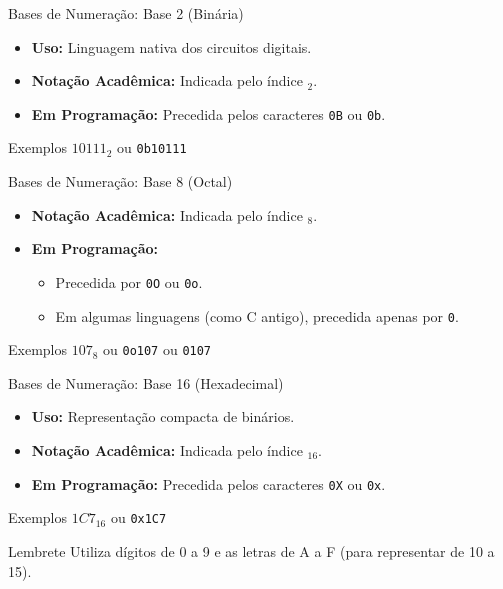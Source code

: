 \begin{frame}{Bases de Numeração: Base 2 (Binária)}
    \begin{itemize}
        \item \textbf{Uso:} Linguagem nativa dos circuitos digitais.
        \item \textbf{Notação Acadêmica:} Indicada pelo índice $_2$.
        \item \textbf{Em Programação:} Precedida pelos caracteres \texttt{0B} ou \texttt{0b}.
    \end{itemize}

    \begin{exampleblock}{Exemplos}
        \centering
        $10111_2$ \quad ou \quad \texttt{0b10111}
    \end{exampleblock}


\end{frame}

\begin{frame}{Bases de Numeração: Base 8 (Octal)}
    \begin{itemize}
        \item \textbf{Notação Acadêmica:} Indicada pelo índice $_8$.
        \item \textbf{Em Programação:}
              \begin{itemize}
                  \item Precedida por \texttt{0O} ou \texttt{0o}.
                  \item Em algumas linguagens (como C antigo), precedida apenas por \texttt{0}.
              \end{itemize}
    \end{itemize}

    \begin{exampleblock}{Exemplos}
        \centering
        $107_8$ \quad ou \quad \texttt{0o107} \quad ou \quad \texttt{0107}
    \end{exampleblock}
\end{frame}



\begin{frame}{Bases de Numeração: Base 16 (Hexadecimal)}
    \begin{itemize}
        \item \textbf{Uso:} Representação compacta de binários.
        \item \textbf{Notação Acadêmica:} Indicada pelo índice $_{16}$.
        \item \textbf{Em Programação:} Precedida pelos caracteres \texttt{0X} ou \texttt{0x}.
    \end{itemize}

    \begin{exampleblock}{Exemplos}
        \centering
        $1C7_{16}$ \quad ou \quad \texttt{0x1C7}
    \end{exampleblock}

    \begin{alertblock}{Lembrete}
        Utiliza dígitos de 0 a 9 e as letras de A a F (para representar de 10 a 15).
    \end{alertblock}
\end{frame}

